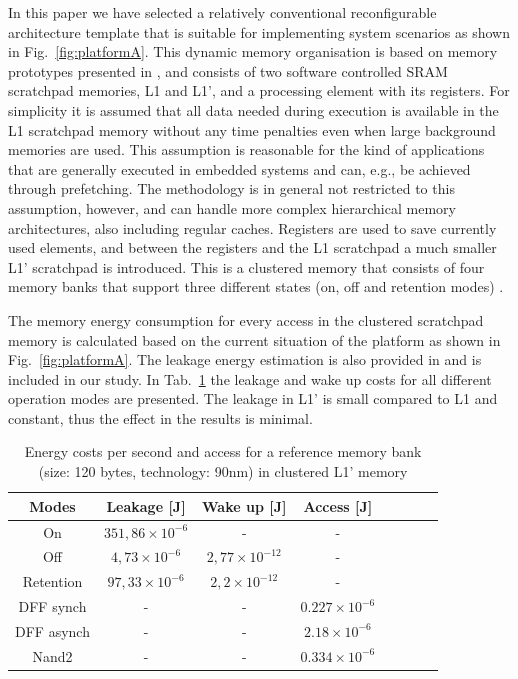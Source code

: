 In this paper we have selected a relatively conventional reconfigurable architecture template that is suitable for implementing system scenarios as shown in Fig.~\ref{fig:platformA}. This dynamic memory organisation is based on memory prototypes presented in \cite{Artes2011}, and consists of two software controlled SRAM scratchpad memories, L1 and L1', and a processing element with its registers. For simplicity it is assumed that all data needed during execution is available in the L1 scratchpad memory without any time penalties even when large background memories are used. This assumption is reasonable for the kind of applications that are generally executed in embedded systems and can, e.g., be achieved through prefetching. The methodology is in general not restricted to this assumption, however, and can handle more complex hierarchical memory architectures, also including regular caches. Registers are used to save currently used elements, and between the registers and the L1 scratchpad a much smaller L1' scratchpad is introduced. This is a clustered memory that consists of four memory banks that support three different states (on, off and retention modes) \cite{Artes2011}. 

The memory energy consumption for every access in the clustered scratchpad memory is calculated based on the current situation of the platform as shown in Fig.~\ref{fig:platformA}. The leakage energy estimation is also provided in \cite{Artes2011} and is included in our study. In Tab.~\ref{tab:leakage} the leakage and wake up costs for all different operation modes are presented. The leakage in L1' is small compared to L1 and constant, thus the effect in the results is minimal.

\begin{table}[!t]
\centering
\caption{Energy costs per second and access for a reference memory bank (size: 120 bytes, technology: 90nm) in clustered L1' memory }
\label{tab:leakage}
\begin{tabular}{|c|c|c|c|c|c|c|c|}
\hline 
Modes & Leakage [J] & Wake up [J] & Access [J]\\ 
\hline 
On & $351,86 \times 10 ^{-6}$ & - & -  \\ 
\hline 
Off & $ 4,73 \times 10 ^{-6}$ & $ 2,77 \times 10 ^{-12}$ & -\\ 
\hline 
Retention & $ 97,33 \times 10 ^{-6}$ & $ 2,2 \times 10 ^{-12}$ & -\\ 
\hline 
DFF synch & - & - & $ 0.227 \times 10 ^{-6}$\\ 
\hline
DFF asynch & - & - & $ 2.18 \times 10 ^{-6}$\\ 
\hline 
Nand2 & - & - & $ 0.334 \times 10 ^{-6}$\\ 
\hline
\end{tabular}      
\end{table}

